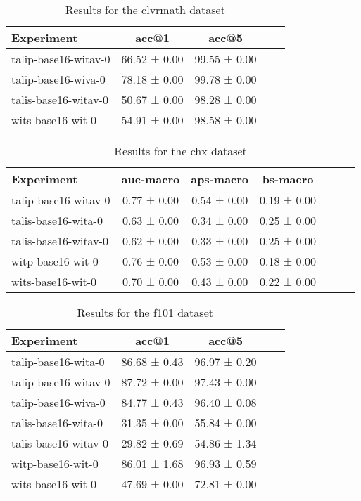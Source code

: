 \begin{table}[htbp]
\caption{Results for the clvrmath dataset}
\begin{tabular}{|l|c|c|c|c|}\hline
Experiment & acc@1 & acc@5\\
\hline
talip-base16-witav-0 & 66.52 ± 0.00 & 99.55 ± 0.00\\
\hline
talip-base16-wiva-0 & 78.18 ± 0.00 & 99.78 ± 0.00\\
\hline
talis-base16-witav-0 & 50.67 ± 0.00 & 98.28 ± 0.00\\
\hline
wits-base16-wit-0 & 54.91 ± 0.00 & 98.58 ± 0.00\\
\hline
\end{tabular}
\end{table}

\begin{table}[htbp]
\caption{Results for the chx dataset}
\begin{tabular}{|l|c|c|c|c|c|c|}\hline
Experiment & auc-macro & aps-macro & bs-macro\\
\hline
talip-base16-witav-0 & 0.77 ± 0.00 & 0.54 ± 0.00 & 0.19 ± 0.00\\
\hline
talis-base16-wita-0 & 0.63 ± 0.00 & 0.34 ± 0.00 & 0.25 ± 0.00\\
\hline
talis-base16-witav-0 & 0.62 ± 0.00 & 0.33 ± 0.00 & 0.25 ± 0.00\\
\hline
witp-base16-wit-0 & 0.76 ± 0.00 & 0.53 ± 0.00 & 0.18 ± 0.00\\
\hline
wits-base16-wit-0 & 0.70 ± 0.00 & 0.43 ± 0.00 & 0.22 ± 0.00\\
\hline
\end{tabular}
\end{table}

\begin{table}[htbp]
\caption{Results for the f101 dataset}
\begin{tabular}{|l|c|c|c|c|}\hline
Experiment & acc@1 & acc@5\\
\hline
talip-base16-wita-0 & 86.68 ± 0.43 & 96.97 ± 0.20\\
\hline
talip-base16-witav-0 & 87.72 ± 0.00 & 97.43 ± 0.00\\
\hline
talip-base16-wiva-0 & 84.77 ± 0.43 & 96.40 ± 0.08\\
\hline
talis-base16-wita-0 & 31.35 ± 0.00 & 55.84 ± 0.00\\
\hline
talis-base16-witav-0 & 29.82 ± 0.69 & 54.86 ± 1.34\\
\hline
witp-base16-wit-0 & 86.01 ± 1.68 & 96.93 ± 0.59\\
\hline
wits-base16-wit-0 & 47.69 ± 0.00 & 72.81 ± 0.00\\
\hline
\end{tabular}
\end{table}


